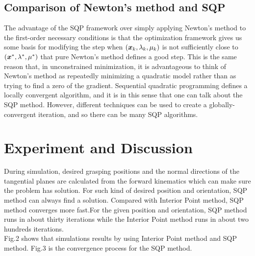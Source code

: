 \documentclass[journal,comsoc]{IEEEtran}
\begin{document}
\subsection{Comparison of Newton's method and SQP }

The advantage of the SQP framework over simply applying Newton's method to the first-order necessary conditions is that the optimization framework gives us some basis for modifying the step when $(\mbox{\boldmath $x$}_k, \lambda_k, \mu_k)$ is not sufficiently close to $(\mbox{\boldmath $x$}^*, \lambda^*, \mu^*)$ that pure Newton's method defines a good step. This is the same reason that, in unconstrained minimization, it is advantageous to think of Newton's method as repeatedly minimizing a quadratic model rather than as trying to find a zero of the gradient. Sequential quadratic programming defines a locally convergent algorithm, and it is in this sense that one can talk about the SQP method. However, different techniques can be used to create a globally-convergent iteration, and so there can be many SQP algorithms. 

\section{Experiment and Discussion} 
During simulation, desired grasping positions and the normal directions of the tangential planes are calculated from the forward kinematics which can make sure the problem has solution. For such kind of desired position and orientation, SQP method can always find a solution.
Compared with Interior Point method, SQP method converges more fast.For the given position and orientation, SQP method runs in about thirty iterations while the Interior Point method runs in about two hundreds iterations. \\
 Fig.2 shows that simulations results by using Interior Point method and SQP method. Fig.3 is the convergence process for the SQP method. 
\end{document}
